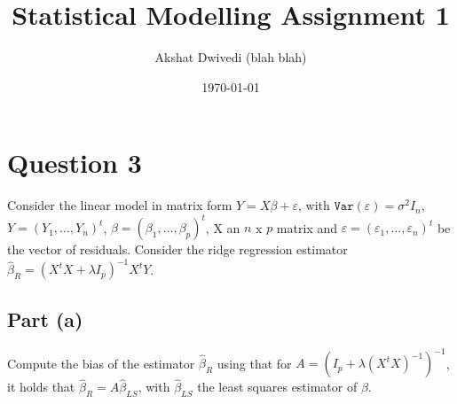 \documentclass[paper=a4, fontsize=11pt]{scrartcl} %
\title{Statistical Modelling Assignment 1}
\author{Akshat Dwivedi (blah blah)}
\date{\today}
\numberwithin{equation}{section} %
\begin{document}
\maketitle

\section*{Question 3}

Consider the linear model in matrix form $Y = X\beta + \varepsilon$, with $\texttt{Var}(\varepsilon) = \sigma^2 I_n$, $Y = (Y_1, \ldots, Y_n)^t$, $\beta = (\beta_1, \ldots, \beta_p)^t$, X an $n$ x $p$ matrix and $\varepsilon = (\varepsilon_1, \ldots, \varepsilon_n)^t$ be the vector of residuals. Consider the ridge regression estimator $\hat{\beta}_R = (X^tX + \lambda I_p)^{-1} X^t Y$.

\subsection*{Part (a)}

Compute the bias of the estimator $\hat{\beta}_R$ using that for $A = (I_p + \lambda(X^t X)^{-1})^{-1}$, it holds that $\hat{\beta}_R = A \hat{\beta}_{LS}$, with $\hat{\beta}_{LS}$ the least squares estimator of $\beta$.
\end{document}
